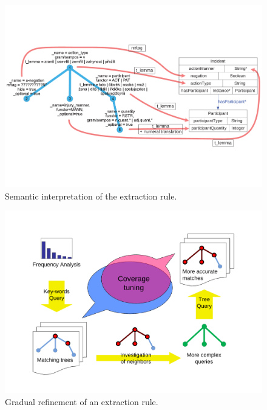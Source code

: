 \begin{figure}
	\centering
		\includegraphics[angle=-90, width=0.9\hsize]{../img/ch3_semantic_interpretation}
	\caption{Semantic interpretation of the extraction rule.}
	\label{fig:ch3_semantic_interpretation}
\end{figure}


\begin{figure}
	\centering
		\includegraphics[angle=-90, width=0.5\hsize]{../img/ch3_coverge_tuning}
	\caption{Gradual refinement of an extraction rule.}
	\label{fig:ch3_coverge_tuning}
\end{figure}


